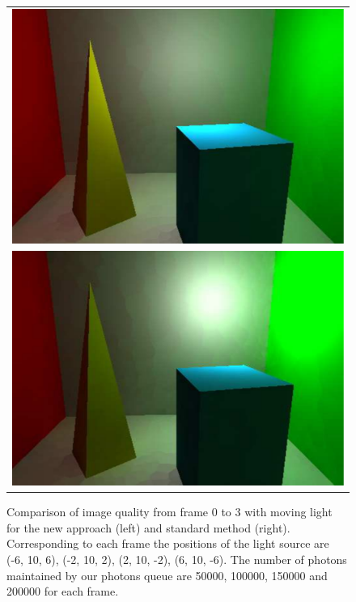 \begin{figure}
\begin{center}
{\begin{tabular}{c}
\includegraphics*[scale=0.2]{imgs/pq2_ref_frame2.pdf}\\
\includegraphics*[scale=0.2]{imgs/pq2_ref_frame3.pdf}
\end{tabular}
}%
\renewcommand{\thefigure}{\thechapter.\arabic{figure}}
\caption[Comparison of image quality from frame 0 to 3 with moving light]{Comparison of image quality from frame 0 to 3 with moving light for the new approach (left) and standard method (right). Corresponding to each frame the positions of the light source are (-6, 10, 6), (-2, 10, 2), (2, 10, -2), (6, 10, -6). The number of photons maintained by our photons queue are 50000, 100000, 150000 and 200000 for each frame.}
\label{fig:result2_images1}
\end{center}
\end{figure}

